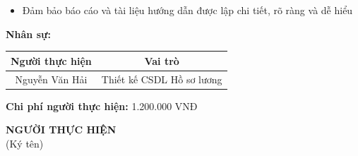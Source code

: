 {\begin{minipage}{\textwidth}
\begin{itemize}
            \item Đảm bảo báo cáo và tài liệu hướng dẫn được lập chi tiết, rõ ràng và dễ hiểu
        \end{itemize}
        \noindent \textbf{Nhân sự:}
        \begin{longtable}{|c|c|}
        \hline
        \textbf{Người thực hiện} & \textbf{Vai trò} \\
        \hline
        Nguyễn Văn Hải & Thiết kế CSDL Hồ sơ lương \\
        \hline
        \end{longtable}
        \noindent \textbf{Chi phí người thực hiện:} 1.200.000 VNĐ
        \vspace{1cm}
        \begin{flushleft}
            \hspace{8cm} \textbf{NGƯỜI THỰC HIỆN} \\
            \hspace{9.5cm} (Ký tên) \\
            \vspace{1cm}
        \end{flushleft}
	\end{minipage}
}    

